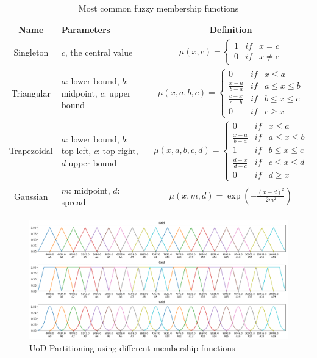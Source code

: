 \index{$\mu$}
\begin{table}[]
    \centering
\begin{tabular}{|c|m{4cm}|c|} \hline
\textbf{Name}  & \textbf{Parameters}  & \textbf{Definition} \\ \hline
Singleton  & $c$, the central value & 
$\mu(x,c) = \left\{ \begin{array}{ccc}
        1 & if & x = c  \\
        0 & if & x \neq c
    \end{array}\right.$ \\ \hline
Triangular  & $a$: lower bound, $b$: midpoint, $c$: upper bound  & 
$\mu(x,a,b,c) = \left\{ \begin{array}{ccc}
        0 & if & x \leq a  \\
        \frac{x-a}{b-a} & if & a \leq x \leq b  \\
        \frac{c-x}{c-b} & if & b \leq x \leq c  \\
        0 & if & c \geq x
    \end{array}\right.$ \\ \hline
Trapezoidal  & $a$: lower bound, $b$: top-left, $c$: top-right, $d$ upper bound & 
$\mu(x,a,b,c,d) = \left\{ \begin{array}{ccc}
        0 & if & x \leq a  \\
        \frac{x-a}{b-a} & if & a \leq x \leq b  \\
        1 & if & b \leq x \leq c  \\
        \frac{d-x}{d-c} & if & c \leq x \leq d  \\
        0 & if & d \geq x
    \end{array}\right.$ \\ \hline
Gaussian  & $m$: midpoint, $d$: spread & 
$\mu(x,m,d) = \exp \left(-\frac{(x-d)^2}{2m^2}\right)$ \\ \hline
\end{tabular}
\caption{Most common fuzzy membership functions}
    \label{tab:fts_membership}
\end{table}

\begin{figure}
    \centering
    \includegraphics[width=\textwidth]{figures/membership.png}
    \caption{UoD Partitioning using different membership functions}
    \label{fig:membership}
\end{figure}

